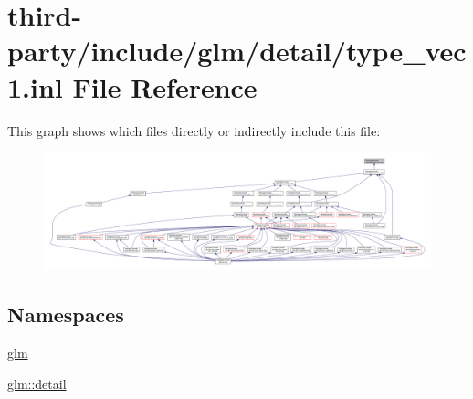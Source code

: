 \hypertarget{type__vec1_8inl}{}\section{third-\/party/include/glm/detail/type\+\_\+vec1.inl File Reference}
\label{type__vec1_8inl}
This graph shows which files directly or indirectly include this file\+:
\nopagebreak
\begin{figure}[H]
\begin{center}
\leavevmode
\includegraphics[width=350pt]{type__vec1_8inl__dep__incl}
\end{center}
\end{figure}
\subsection*{Namespaces}
\begin{DoxyCompactItemize}
\item 
 \hyperlink{namespaceglm}{glm}
\item 
 \hyperlink{namespaceglm_1_1detail}{glm\+::detail}
\end{DoxyCompactItemize}
